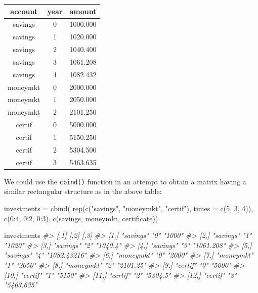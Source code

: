 \documentclass[
]{book}
\newenvironment{Shaded}{\begin{snugshade}}{\end{snugshade}}
\newcommand{\AttributeTok}[1]{\textcolor[rgb]{0.77,0.63,0.00}{#1}}
\newcommand{\CommentTok}[1]{\textcolor[rgb]{0.56,0.35,0.01}{\textit{#1}}}
\newcommand{\DecValTok}[1]{\textcolor[rgb]{0.00,0.00,0.81}{#1}}
\newcommand{\FunctionTok}[1]{\textcolor[rgb]{0.00,0.00,0.00}{#1}}
\newcommand{\NormalTok}[1]{#1}
\newcommand{\OtherTok}[1]{\textcolor[rgb]{0.56,0.35,0.01}{#1}}
\newcommand{\SpecialCharTok}[1]{\textcolor[rgb]{0.00,0.00,0.00}{#1}}
\newcommand{\StringTok}[1]{\textcolor[rgb]{0.31,0.60,0.02}{#1}}
\begin{document}
\begin{longtable}[]{@{}ccc@{}}
\toprule
account & year & amount \\
\midrule
\endhead
savings & 0 & 1000.000 \\
savings & 1 & 1020.000 \\
savings & 2 & 1040.400 \\
savings & 3 & 1061.208 \\
savings & 4 & 1082.432 \\
moneymkt & 0 & 2000.000 \\
moneymkt & 1 & 2050.000 \\
moneymkt & 2 & 2101.250 \\
certif & 0 & 5000.000 \\
certif & 1 & 5150.250 \\
certif & 2 & 5304.500 \\
certif & 3 & 5463.635 \\
\bottomrule
\end{longtable}

We could use the \texttt{cbind()} function in an attempt to obtain a matrix having
a similar rectangular structure as in the above table:

\begin{Shaded}
\begin{Highlighting}[]
\NormalTok{investments }\OtherTok{=} \FunctionTok{cbind}\NormalTok{(}
  \FunctionTok{rep}\NormalTok{(}\FunctionTok{c}\NormalTok{(}\StringTok{"savings"}\NormalTok{, }\StringTok{"moneymkt"}\NormalTok{, }\StringTok{"certif"}\NormalTok{), }\AttributeTok{times =} \FunctionTok{c}\NormalTok{(}\DecValTok{5}\NormalTok{, }\DecValTok{3}\NormalTok{, }\DecValTok{4}\NormalTok{)),}
  \FunctionTok{c}\NormalTok{(}\DecValTok{0}\SpecialCharTok{:}\DecValTok{4}\NormalTok{, }\DecValTok{0}\SpecialCharTok{:}\DecValTok{2}\NormalTok{, }\DecValTok{0}\SpecialCharTok{:}\DecValTok{3}\NormalTok{), }
  \FunctionTok{c}\NormalTok{(savings, moneymkt, certificate))}

\NormalTok{investments}
\CommentTok{\#\textgreater{}       [,1]       [,2] [,3]        }
\CommentTok{\#\textgreater{}  [1,] "savings"  "0"  "1000"      }
\CommentTok{\#\textgreater{}  [2,] "savings"  "1"  "1020"      }
\CommentTok{\#\textgreater{}  [3,] "savings"  "2"  "1040.4"    }
\CommentTok{\#\textgreater{}  [4,] "savings"  "3"  "1061.208"  }
\CommentTok{\#\textgreater{}  [5,] "savings"  "4"  "1082.43216"}
\CommentTok{\#\textgreater{}  [6,] "moneymkt" "0"  "2000"      }
\CommentTok{\#\textgreater{}  [7,] "moneymkt" "1"  "2050"      }
\CommentTok{\#\textgreater{}  [8,] "moneymkt" "2"  "2101.25"   }
\CommentTok{\#\textgreater{}  [9,] "certif"   "0"  "5000"      }
\CommentTok{\#\textgreater{} [10,] "certif"   "1"  "5150"      }
\CommentTok{\#\textgreater{} [11,] "certif"   "2"  "5304.5"    }
\CommentTok{\#\textgreater{} [12,] "certif"   "3"  "5463.635"}
\end{Highlighting}
\end{Shaded}
\end{document}
